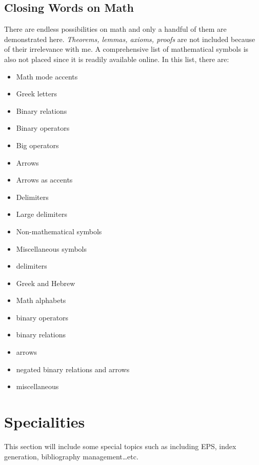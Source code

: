 \documentclass[10pt, a4paper]{article}
\begin{document}
\subsection{Closing Words on Math}
There are endless possibilities on math and only a handful of them are demonstrated here. \emph{Theorems, lemmas, axioms, proofs} are not included because of their irrelevance with me. A comprehensive list of mathematical symbols is also not placed since it is readily available online. In this list, there are:
\begin{itemize}
\item Math mode accents
\item Greek letters
\item Binary relations
\item Binary operators
\item Big operators
\item Arrows
\item Arrows as accents
\item Delimiters
\item Large delimiters
\item Non-mathematical symbols
\item Miscellaneous symbols
\item \AmS{} delimiters
\item \AmS{} Greek and Hebrew
\item Math alphabets
\item \AmS{} binary operators
\item \AmS{} binary relations
\item \AmS{} arrows
\item \AmS{} negated binary relations and arrows
\item \AmS{} miscellaneous
\end{itemize}
\newpage
\section{Specialities}
This section will include some special topics such as including EPS, index generation, bibliography management\ldots etc. 
\end{document}
